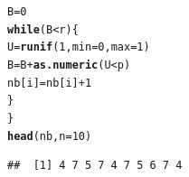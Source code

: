 \documentclass[11pt]{article}\usepackage[]{graphicx}\usepackage[dvipsnames]{xcolor}
\makeatletter
\newcommand{\hlnum}[1]{\textcolor[rgb]{0.686,0.059,0.569}{#1}}%
\newcommand{\hlopt}[1]{\textcolor[rgb]{0,0,0}{#1}}%
\newcommand{\hldef}[1]{\textcolor[rgb]{0.345,0.345,0.345}{#1}}%
\newcommand{\hlkwa}[1]{\textcolor[rgb]{0.161,0.373,0.58}{\textbf{#1}}}%
\newcommand{\hlkwb}[1]{\textcolor[rgb]{0.69,0.353,0.396}{#1}}%
\newcommand{\hlkwc}[1]{\textcolor[rgb]{0.333,0.667,0.333}{#1}}%
\newcommand{\hlkwd}[1]{\textcolor[rgb]{0.737,0.353,0.396}{\textbf{#1}}}%
\newenvironment{kframe}{%
 \def\at@end@of@kframe{}%
 \ifinner\ifhmode%
  \def\at@end@of@kframe{\end{minipage}}%
  \begin{minipage}{\columnwidth}%
 \fi\fi%
 \def\FrameCommand##1{\hskip\@totalleftmargin \hskip-\fboxsep
 \colorbox{shadecolor}{##1}\hskip-\fboxsep
     \hskip-\linewidth \hskip-\@totalleftmargin \hskip\columnwidth}%
 \MakeFramed {\advance\hsize-\width
   \@totalleftmargin\z@ \linewidth\hsize
   \@setminipage}}%
 {\par\unskip\endMakeFramed%
 \at@end@of@kframe}
\newenvironment{knitrout}{}{} %
\theoremstyle{problemstyle}
\makeatother
\begin{document}
\begin{enumerate}[label=\arabic*.]
\begin{enumerate}[label=(\alph*)]
\begin{knitrout}
\begin{kframe}
\begin{alltt}
        \hldef{B} \hlkwb{=} \hlnum{0}
        \hlkwa{while}\hldef{(B} \hlopt{<} \hldef{r) \{}
            \hldef{U} \hlkwb{=} \hlkwd{runif}\hldef{(}\hlnum{1}\hldef{,} \hlkwc{min} \hldef{=} \hlnum{0}\hldef{,} \hlkwc{max} \hldef{=} \hlnum{1}\hldef{)}
            \hldef{B} \hlkwb{=} \hldef{B} \hlopt{+} \hlkwd{as.numeric}\hldef{(U}\hlopt{<}\hldef{p)}
            \hldef{nb[i]} \hlkwb{=} \hldef{nb[i]} \hlopt{+} \hlnum{1}
        \hldef{\}}
    \hldef{\}}
    \hlkwd{head}\hldef{(nb,} \hlkwc{n} \hldef{=} \hlnum{10}\hldef{)}
\end{alltt}
\begin{verbatim}
##  [1] 4 7 5 7 4 7 5 6 7 4
\end{verbatim}
\end{kframe}
\end{knitrout}
    

\end{enumerate}
\end{enumerate}
\end{document}
